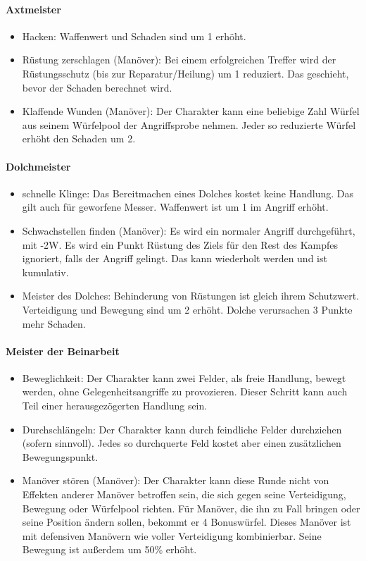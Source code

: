 \documentclass{article}
\begin{document}
\paragraph{Axtmeister}

\begin{itemize}
\item Hacken: Waffenwert und Schaden sind um 1 erhöht.
\item Rüstung zerschlagen (Manöver): Bei einem erfolgreichen Treffer wird der Rüstungsschutz (bis zur Reparatur/Heilung) um 1 reduziert. Das geschieht, bevor der Schaden berechnet wird.
\item Klaffende Wunden (Manöver): Der Charakter kann eine beliebige Zahl Würfel aus seinem Würfelpool der Angriffsprobe nehmen. Jeder so reduzierte Würfel erhöht den Schaden um 2.
\end{itemize}

\paragraph{Dolchmeister}

\begin{itemize}
\item schnelle Klinge: Das Bereitmachen eines Dolches kostet keine Handlung. Das gilt auch für geworfene Messer. Waffenwert ist um 1 im Angriff erhöht.
\item Schwachstellen finden (Manöver): Es wird ein normaler Angriff durchgeführt, mit -2W. Es wird ein Punkt Rüstung des Ziels für den Rest des Kampfes ignoriert, falls der Angriff gelingt. Das kann wiederholt werden und ist kumulativ.
\item Meister des Dolches: Behinderung von Rüstungen ist gleich ihrem Schutzwert. Verteidigung und Bewegung sind um 2 erhöht. Dolche verursachen 3 Punkte mehr Schaden.
\end{itemize}

\paragraph{Meister der Beinarbeit}

\begin{itemize}
\item Beweglichkeit: Der Charakter kann zwei Felder, als freie Handlung, bewegt werden, ohne Gelegenheitsangriffe zu provozieren. Dieser Schritt kann auch Teil einer herausgezögerten Handlung sein.
\item Durchschlängeln: Der Charakter kann durch feindliche Felder durchziehen (sofern sinnvoll). Jedes so durchquerte Feld kostet aber einen zusätzlichen Bewegungspunkt.
\item Manöver stören (Manöver): Der Charakter kann diese Runde nicht von Effekten anderer Manöver betroffen sein, die sich gegen seine Verteidigung, Bewegung oder Würfelpool richten. Für Manöver, die ihn zu Fall bringen oder seine Position ändern sollen, bekommt er 4 Bonuswürfel. Dieses Manöver ist mit defensiven Manövern wie voller Verteidigung kombinierbar. Seine Bewegung ist außerdem um 50\% erhöht.
\end{itemize}
\end{document}
